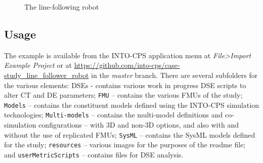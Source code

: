 \begin{figure}[htb!]
\begin{center}
\caption{The line-following robot}
\label{fig:linefollowoverview}
\end{center}
\end{figure}

\subsection{Usage}
\label{sec:linefollower_usage}

The example is available from the INTO-CPS application menu at \emph{File>Import Example Project} or at  \url{https://github.com/into-cps/case-study\_line\_follower\_robot} in the \emph{master} branch. There are several subfolders for the various elements: DSEs - contains various work in progress DSE scripts to alter CT and DE parameters; \texttt{FMU} -- contains the various FMUs of the study; \texttt{Models} -- contains the constituent models defined using the INTO-CPS simulation technologies; \texttt{Multi-models} -- contains the multi-model definitions and co-simulation configurations -- with 3D and non-3D options, and also with and without the use of replicated FMUs; \texttt{SysML} -- contains the SysML models defined for the study; \texttt{resources} -- various images for the purposes of the readme file; and \texttt{userMetricScripts} -- contains files for DSE analysis. 

